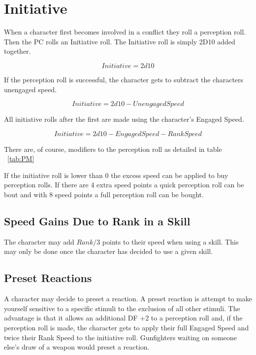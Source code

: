 


\section{Initiative}

When a character first becomes involved in a conflict they
roll a perception roll. Then the PC rolls an {Initiative} roll. The 
Initiative roll is simply 2D10 added together.

\[{Initiative} = 2d10\]

If the perception roll is successful, the character gets to subtract
the characters unengaged speed.

\[{Initiative} = 2d10 - {Unengaged Speed}\]

All initiative rolls after the first are made using the character's Engaged Speed.

\[{Initiative} = 2d10 - {Engaged Speed} - {Rank Speed}\] 

There are, of course, modifiers to the perception roll as detailed in table 
~\ref{tab:PM}

If the initiative roll is lower than 0 the excess speed can be applied to 
buy perception rolls. If there are 4 extra speed points a quick perception roll
can be bout and with 8 speed points a full perception roll can be bought.

\subsection{Speed Gains Due to Rank in a Skill}

The character may add \( Rank/3 \) points to their speed when using a
skill. This may only be done once the character has decided to use a
given skill. 

\subsection{Preset Reactions}

A character may decide to preset a reaction. A preset reaction is 
attempt to make yourself sensitive to a specific stimuli to the exclusion
of all other stimuli. The advantage is that it allows an additional DF +2 
to a perception roll and, if the perception roll is made, the character gets
to apply their full Engaged Speed and twice their Rank Speed to the 
initiative roll. Gunfighters waiting on someone else's 
draw of a weapon would preset a reaction. 

